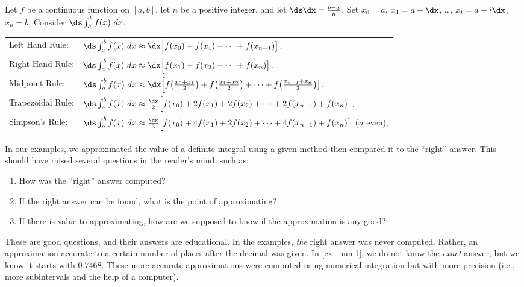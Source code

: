 \setboxwidth{140pt}%
{Let $f$ be a continuous function on $[a,b]$, let $n$ be a positive integer, and let $\ds\dx = \frac{b-a}{n}$.
Set $x_0=a$, $x_1=a+\dx$, \ldots, $x_i = a+i\dx$, $x_n=b$.
Consider $\ds\int_a^b f(x)\ dx$.\\
\begin{tabular}{ll}
Left Hand Rule: &
$\ds\int_a^b f(x)\ dx \approx \dx\Big[f(x_0) + f(x_1) + \dotsb + f(x_{n-1})\big]$.\\
Right Hand Rule: &
$\ds\int_a^b f(x)\ dx \approx \dx\Big[f(x_1) + f(x_2) + \dotsb + f(x_n)\big]$.\\
Midpoint Rule: &
$\ds\int_a^b f(x)\ dx \approx \dx\Big[f\big(\frac{x_0+x_1}2\big) + f\big(\frac{x_1+x_2}2\big) + \dotsb + f\big(\frac{x_{n-1}+x_n}2\big)\big]$.\\
Trapezoidal Rule: &
$\ds\int_a^b f(x)\ dx \approx \frac{\dx}2\Big[f(x_0) + 2f(x_1) + 2f(x_2) +\dotsb + 2f(x_{n-1})+ f(x_n)\big]$.\\
Simpson's Rule: &
$\ds\int_a^b f(x)\ dx \approx \frac{\dx}3\Big[f(x_0) + 4f(x_1) + 2f(x_2) +\dotsb + 4f(x_{n-1})+ f(x_n)\big]$ {\small ($n$ even)}.
\end{tabular}}

In our examples, we approximated the value of a definite integral using a given method then compared it to the ``right'' answer. This should have raised several questions in the reader's mind, such as:
\begin{enumerate}
	\item	How was the ``right'' answer computed?
	\item	If the right answer can be found, what is the point of approximating?
	\item	If there is value to approximating, how are we supposed to know if the approximation is any good?
\end{enumerate}

These are good questions, and their answers are educational. In the examples, \textit{the} right answer was never computed. Rather, an approximation accurate to a certain number of places after the decimal was given. In \autoref{ex_num1}, we do not know the \textit{exact} answer, but we know it starts with 0.7468. These more accurate approximations were computed using numerical integration but with more precision (i.e., more subintervals and the help of a computer). 

